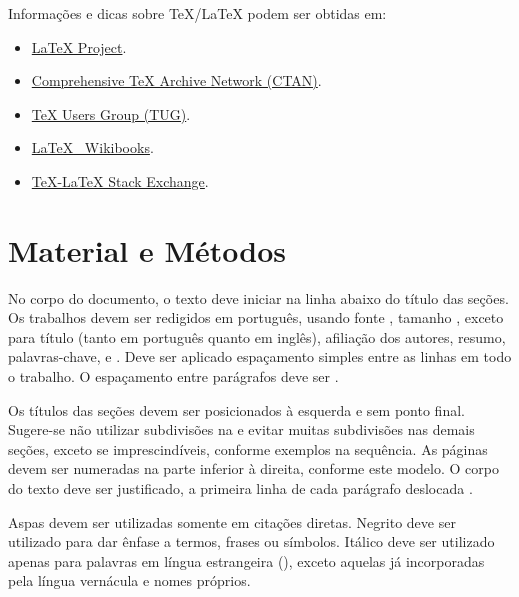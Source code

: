\documentclass[%
  a4paper,%
  12pt,%
  fleqn,%
  english,%
  brazilian,%
]{article}
\begin{document}
Informações e dicas sobre \TeX{}/\LaTeX{} podem ser obtidas em:

\begin{itemize}
\item \href{https://www.latex-project.org/}{\LaTeX{} Project\LinkIcon}.
\item \href{https://www.ctan.org/}{Comprehensive \TeX{} Archive Network (CTAN)\LinkIcon}.
\item \href{https://www.tug.org/}{\TeX{} Users Group (TUG)\LinkIcon}.
\item \href{https://en.wikibooks.org/wiki/LaTeX/}{\LaTeX{} \textemdash\ Wikibooks\LinkIcon}.
\item \href{https://tex.stackexchange.com/}{\TeX{}-\LaTeX{} Stack Exchange\LinkIcon}.
\end{itemize}

\section{Material e Métodos}%
\label{sect:mat-meth}

No corpo do documento, o texto deve iniciar na linha abaixo do título das seções.
Os trabalhos devem ser redigidos em português, usando fonte , tamanho , exceto para título (tanto em português quanto em inglês), afiliação dos autores, resumo, palavras-chave,  e .
Deve ser aplicado espaçamento simples entre as linhas em todo o trabalho.
O espaçamento entre parágrafos deve ser .

Os títulos das seções devem ser posicionados à esquerda e sem ponto final.
Sugere-se não utilizar subdivisões na  e evitar muitas subdivisões nas demais seções, exceto se imprescindíveis, conforme exemplos na sequência.
As páginas devem ser numeradas na parte inferior à direita, conforme este modelo.
O corpo do texto deve ser justificado, a primeira linha de cada parágrafo deslocada .

Aspas devem ser utilizadas somente em citações diretas.
Negrito deve ser utilizado para dar ênfase a termos, frases ou símbolos.
Itálico deve ser utilizado apenas para palavras em língua estrangeira (), exceto aquelas já incorporadas pela língua vernácula e nomes próprios.
\end{document}
